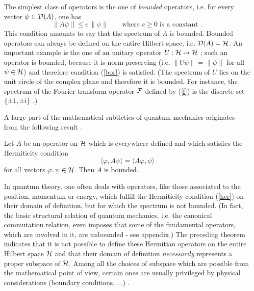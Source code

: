 \documentclass[a4wide,12pt]{report}
\begin{document}
The simplest class of operators is the one of {\em bounded} 
operators, i.e. for every vector 
$\psi \in {\cal D}(A)$, one has 
\begin{equation}
\label{bor}
\| A  \psi \| \leq c \, \| \psi \|
\qquad \mbox{where $c\geq 0$ is a constant}
\ \ .
\end{equation}
This condition amounts to say that the spectrum of $A$ is bounded. 
Bounded operators can always be defined on the entire Hilbert space, 
i.e. ${\cal D}(A)= {\cal H}$. 
 An important example is the one of an unitary operator 
$U : {\cal H} \to {\cal H}$ ; such an operator is bounded, because
it is norm-preserving 
(i.e. $\| U  \psi \| = \| \psi \|$
 for all $\psi \in {\cal H}$) and therefore condition (\ref{bor})
is satisfied. (The spectrum of $U$ lies
on the unit circle of the complex plane and therefore it is bounded.
For instance, 
the spectrum of the Fourier transform operator ${\cal F}$ 
defined by (\ref{f}) is the discrete set $\{ \pm 1, \pm {\rm i} \}$ 
\cite{af,lio}.)
 
A large part of the mathematical subtleties of quantum mechanics
originates from the following result
\cite{sg, rs}.
\begin{theo}
   Let  $A$ be an operator on ${\cal H}$ which is everywhere defined 
   and which satisfies the Hermiticity condition 
\begin{equation}
\label{her}
\langle \varphi , A  \psi \rangle =
\langle A  \varphi  ,   \psi \rangle
\end{equation}
for all vectors $\varphi, \psi \in {\cal H}$.
Then $A$ is bounded.
\end{theo}
In quantum theory, one often deals with operators, like those 
associated to the position, momentum or energy, which fulfill the 
Hermiticity condition (\ref{her}) on their domain of definition,
but for which the spectrum is not bounded. 
(In fact, the basic structural relation of quantum mechanics, 
i.e. the canonical commutation relation, even imposes 
that some of the fundamental operators, which are involved in it,   
are unbounded - see appendix.) 
The preceding theorem
indicates that it is not possible to define these Hermitian 
operators on the entire Hilbert space ${\cal H}$ and that their
domain of definition {\em necessarily} 
represents a proper subspace of ${\cal H}$.
Among all the choices of subspace which are possible from 
the mathematical point of view, certain ones are usually privileged 
by physical considerations (boundary conditions, ...) 
\cite{aw,rs,sg,ber,th}.
\end{document}
